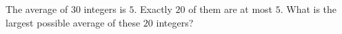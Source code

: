 The average of $30$ integers is $5$. Exactly $20$ of them are at most $5$. What is the largest possible average of these $20$ integers?
